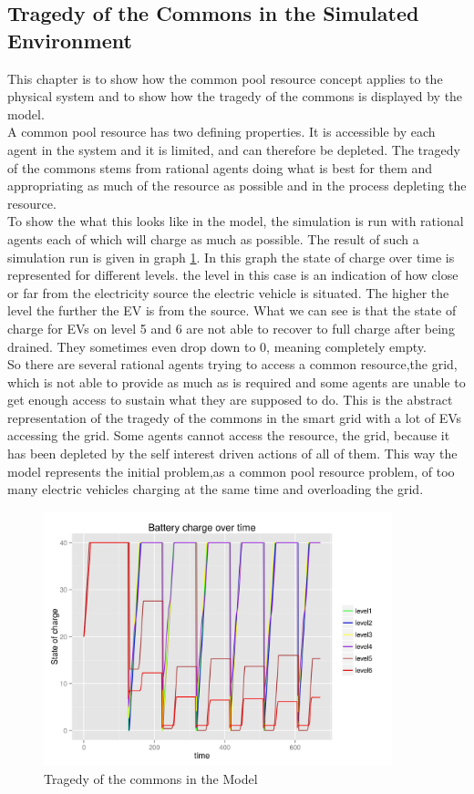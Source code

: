 \documentclass[a4paper]{article}
\begin{document}
\subsection{Tragedy of the Commons in the Simulated Environment}
This chapter is to show how the common pool resource concept applies to the physical system and to show how 
the tragedy of the commons is displayed by the model. \\
A common pool resource has two defining properties. It is accessible by each agent in the system and it is limited, and can 
therefore be depleted. The tragedy of the commons stems from rational agents doing what is best for them and 
appropriating as much of the resource as possible and in the process depleting the resource. \\
To show the what this looks like in the model, the simulation is run with rational agents each of which will charge 
as much as possible.
The result of such a simulation run is given in graph \ref{software_tragedy}. In this graph the state of charge over 
time is 
represented for different levels. the level in this case is an indication of how close or far from the 
electricity source the electric vehicle is situated. The higher the level the further the EV is from the source. 
What we can see is that the state of charge for EVs on level 5 and 6 are not able to recover to full charge after being 
drained. They sometimes even drop down to 0, meaning completely empty.\\
So there are several rational agents trying to access a common resource,the grid, which is not able to provide as much 
as is required and some agents are unable to get enough access to sustain what they are supposed to do.
This is the abstract 
representation of the tragedy of the commons in the smart grid with a lot of EVs accessing the grid. Some agents 
cannot access the resource, the grid, because it has been depleted by the self interest driven actions of 
all of them. This way the model represents the initial problem,as a common pool resource problem, 
of too many electric vehicles charging at the same time and overloading the grid. 


\begin{figure}[!ht]
 \centering
 \includegraphics[width = 0.9\textwidth]{tragedy_of_commons.jpg}
 \caption{Tragedy of the commons in the Model}
 \label{software_tragedy}
\end{figure}
\end{document}
